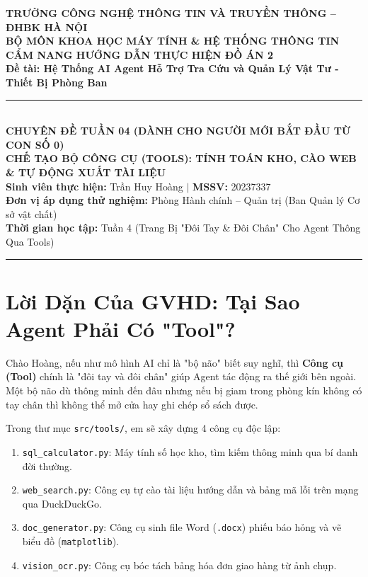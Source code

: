 \documentclass[11pt,a4paper]{article}
\begin{document}
\begin{center}
    {\large \textbf{TRƯỜNG CÔNG NGHỆ THÔNG TIN VÀ TRUYỀN THÔNG -- ĐHBK HÀ NỘI}}\\[0.2em]
    {\normalsize \textbf{BỘ MÔN KHOA HỌC MÁY TÍNH \& HỆ THỐNG THÔNG TIN}}\\[1.0em]
    
    {\Large \bfseries \color{blue!85!black} CẨM NANG HƯỚNG DẪN THỰC HIỆN ĐỒ ÁN 2}\\[0.3em]
    {\large \textbf{Đề tài: Hệ Thống AI Agent Hỗ Trợ Tra Cứu và Quản Lý Vật Tư - Thiết Bị Phòng Ban}}\\[0.8em]
    
    \rule{0.85\textwidth}{0.8pt}\\[0.6em]
    
    {\bfseries CHUYÊN ĐỀ TUẦN 04 (DÀNH CHO NGƯỜI MỚI BẮT ĐẦU TỪ CON SỐ 0)}\\[0.3em]
    {\large \bfseries CHẾ TẠO BỘ CÔNG CỤ (TOOLS): TÍNH TOÁN KHO, CÀO WEB \& TỰ ĐỘNG XUẤT TÀI LIỆU}\\[0.8em]
    
    \small
    \textbf{Sinh viên thực hiện:} Trần Huy Hoàng \quad $\vert$ \quad \textbf{MSSV:} 20237337\\
    \textbf{Đơn vị áp dụng thử nghiệm:} Phòng Hành chính -- Quản trị (Ban Quản lý Cơ sở vật chất)\\
    \textbf{Thời gian học tập:} Tuần 4 (Trang Bị "Đôi Tay \& Đôi Chân" Cho Agent Thông Qua Tools)
\end{center}

\vspace{0.2cm}
\hrule
\vspace{0.3cm}

\section{Lời Dặn Của GVHD: Tại Sao Agent Phải Có "Tool"?}

Chào Hoàng, nếu như mô hình AI chỉ là "bộ não" biết suy nghĩ, thì \textbf{Công cụ (Tool)} chính là "đôi tay và đôi chân" giúp Agent tác động ra thế giới bên ngoài. Một bộ não dù thông minh đến đâu nhưng nếu bị giam trong phòng kín không có tay chân thì không thể mở cửa hay ghi chép sổ sách được.

Trong thư mục \texttt{src/tools/}, em sẽ xây dựng 4 công cụ độc lập:
\begin{enumerate}
    \item \texttt{sql\_calculator.py}: Máy tính số học kho, tìm kiếm thông minh qua bí danh đời thường.
    \item \texttt{web\_search.py}: Công cụ tự cào tài liệu hướng dẫn và bảng mã lỗi trên mạng qua DuckDuckGo.
    \item \texttt{doc\_generator.py}: Công cụ sinh file Word (\texttt{.docx}) phiếu báo hỏng và vẽ biểu đồ (\texttt{matplotlib}).
    \item \texttt{vision\_ocr.py}: Công cụ bóc tách bảng hóa đơn giao hàng từ ảnh chụp.
\end{enumerate}
\end{document}
